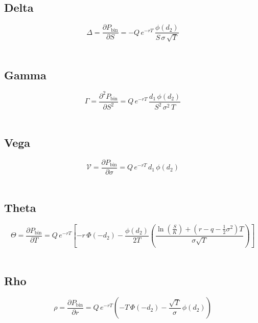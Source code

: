 \documentclass[12pt,a4paper]{article}
\begin{document}
\subsection{Delta}
\[
  \boxed{\Delta = \frac{\partial P_{\mathrm{bin}}}{\partial S}
  = -Q\, e^{-rT}\, \frac{\phi(d_2)}{S\,\sigma\,\sqrt{T}}}
\]

\[
  \begin{aligned}
  \end{aligned}
\]

\subsection{Gamma}
\[
  \boxed{\Gamma = \frac{\partial^2 P_{\mathrm{bin}}}{\partial S^2}
  = Q\, e^{-rT}\, \frac{d_1\,\phi(d_2)}{S^2\,\sigma^2\,T}}
\]

\[
  \begin{aligned}
  \end{aligned}
\]

\subsection{Vega}
\[
  \boxed{\mathcal{V} = \frac{\partial P_{\mathrm{bin}}}{\partial \sigma}
  = Q\, e^{-rT}\, d_1\,\phi(d_2)}
\]

\[
  \begin{aligned}
  \end{aligned}
\]

\subsection{Theta}
\[
  \boxed{\Theta = \frac{\partial P_{\mathrm{bin}}}{\partial T}
  = Q\, e^{-rT}\!\left[
  -r\,\Phi(-d_2)
  - \frac{\phi(d_2)}{2T}
    \left(
      \frac{\ln(\tfrac{S}{K}) + (r - q - \tfrac{1}{2}\sigma^2)T}{\sigma\sqrt{T}}
    \right)
  \right]}
\]

\[
  \begin{aligned}
  \end{aligned}
\]

\subsection{Rho}
\[
  \boxed{\rho = \frac{\partial P_{\mathrm{bin}}}{\partial r}
  = Q\, e^{-rT}\!\left(
    -T\,\Phi(-d_2)
    - \frac{\sqrt{T}}{\sigma}\,\phi(d_2)
  \right)}
\]

\[
  \begin{aligned}
  \end{aligned}
\]
\end{document}
